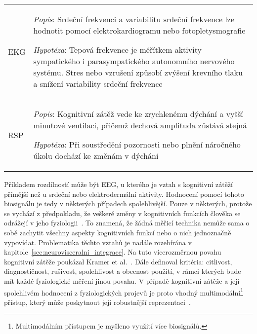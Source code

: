 \begin{table}[ht]
\begin{threeparttable}
\begin{tabular}{p{3cm}p{11cm}}
            \\
            EKG                 & \textit{Popis}: Srdeční frekvenci a variabilitu srdeční frekvence lze hodnotit pomocí elektrokardiogramu nebo fotopletysmografie\newline
            \rule{0pt}{2.5ex}\noindent
            \textit{Hypotéza}: Tepová frekvence je měřítkem aktivity sympatického i parasympatického autonomního nervového systému. Stres nebo vzrušení způsobí zvýšení krevního tlaku a snížení variability srdeční frekvence~\cite{Jercic2020,Solhjoo2019}
            \\
            RSP                 & \textit{Popis}: Kognitivní zátěž vede ke zrychlenému dýchání a vyšší minutové ventilaci, přičemž dechová amplituda zůstává stejná\newline
            \rule{0pt}{2.5ex}\noindent
            \textit{Hypotéza}: Při soustředění pozornosti nebo plnění náročného úkolu dochází ke změnám v dýchání~\cite{Grassmann2016}
            \\
            \bottomrule
        \end{tabular}
    \end{threeparttable}
\end{table}

Příkladem rozdílností může být EEG, u kterého je vztah s kognitivní zátěží
přímější než u srdeční nebo elektrodermální aktivity. Hodnocení pomocí tohoto
biosignálu je tedy v některých případech spolehlivější. Pouze v některých,
protože se vychází z předpokladu, že veškeré změny v kognitivních funkcích
člověka se odrážejí v jeho fyziologii~\cite{Vanneste2021}. To znamená, že žádná
měřicí technika nemůže sama o sobě zachytit všechny aspekty kognitivních funkcí
nebo o nich jednoznačně vypovídat. Problematika těchto vztahů je nadále
rozebírána v kapitole~\ref{sec:neurovisceralni_integrace}. Na tuto vícerozměrnou
povahu kognitivní zátěže poukázal Kramer et al.~\cite{Kramer1991}. Dále
definoval kritéria: citlivost, diagnostičnost, rušivost, spolehlivost a obecnost
použití, v rámci kterých bude mít každé fyziologické měření jinou povahu. V
případě kognitivní zátěže a její spolehlivém hodnocení z fyziologických projevů
je proto vhodný multimodální\footnote{Multimodálním přístupem je myšleno využití
více biosignálů.} přístup, který může poskytnout její robustnější
reprezentaci~\cite{Chen2016}.

